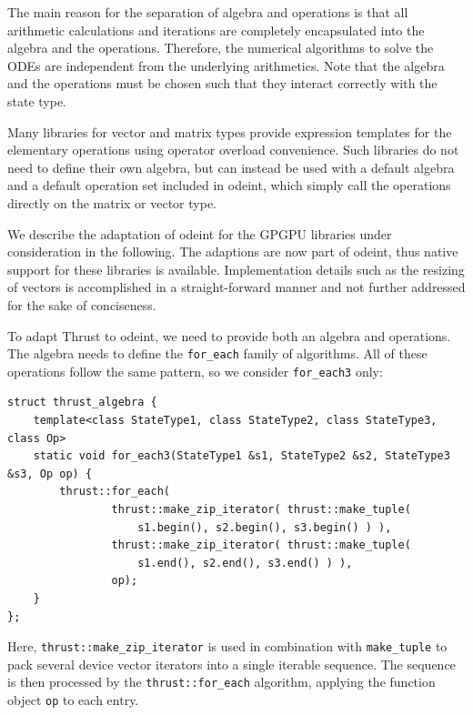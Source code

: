 \documentclass[final]{siamltex}
\newcommand{\code}[1]{\lstinline|#1|}
\begin{document}
The main reason for the separation of algebra and operations is that
all arithmetic calculations and iterations are completely encapsulated
into the algebra and the operations. Therefore, the numerical
algorithms to solve the ODEs are independent from the underlying
arithmetics. Note that the algebra and the operations must be chosen
such that they interact correctly with the state type.

Many libraries for vector and matrix types provide expression templates
\cite{Vandevoorde:CppTemplates,Veldhuizen:ExpressionTemplates, Veldhuizen:Techniques}
for the elementary operations using operator overload
convenience.  Such libraries do not need to define their own algebra, but can
instead be used with a default algebra and a default operation set included in
odeint, which simply call the operations directly on the matrix or vector type.

We describe the adaptation of odeint for the GPGPU libraries under
consideration in the following. The adaptions are now part of odeint, thus
native support for these libraries is available.  Implementation details such as
the resizing of vectors is accomplished in a straight-forward manner and not
further addressed for the sake of conciseness.

To adapt Thrust to odeint, we need to provide both an algebra and
operations. The algebra needs to define the \code{for_each} family of
algorithms. All of these operations follow the same pattern,
so we consider \code{for_each3} only:
\begin{lstlisting}
struct thrust_algebra {
    template<class StateType1, class StateType2, class StateType3, class Op>
    static void for_each3(StateType1 &s1, StateType2 &s2, StateType3 &s3, Op op) {
        thrust::for_each(
                thrust::make_zip_iterator( thrust::make_tuple(
                    s1.begin(), s2.begin(), s3.begin() ) ),
                thrust::make_zip_iterator( thrust::make_tuple(
                    s1.end(), s2.end(), s3.end() ) ),
                op);
    }
};
\end{lstlisting}
Here, \code{thrust::make_zip_iterator} is used in combination with
\code{make_tuple} to pack several device vector iterators into a single
iterable sequence.  The sequence is then processed by the
\code{thrust::for_each} algorithm, applying the function object \code{op} to
each entry.
\end{document}
